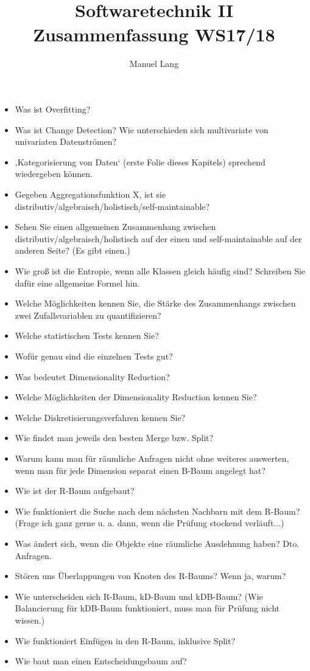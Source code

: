 \documentclass[paper=a4, fontsize=11pt]{scrartcl} %
\title{
\normalfont \normalsize
\horrule{0.5pt} \\[0.4cm] %
\huge Softwaretechnik II\\ Zusammenfassung WS17/18 %
\horrule{2pt} \\[0.5cm] %
}
\author{Manuel Lang} %
\date{} %
\numberwithin{equation}{section} %
\numberwithin{figure}{section} %
\numberwithin{table}{section} %
\begin{document}
\begin{itemize}
\item Was ist Overfitting?
\item Was ist Change Detection? Wie unterschieden sich multivariate von univariaten Datenströmen?
\item ‚Kategorisierung von Daten‘ (erste Folie dieses Kapitels) sprechend wiedergeben können.
\item Gegeben Aggregationsfunktion X, ist sie distributiv/algebraisch/holistisch/self-maintainable?
\item Sehen Sie einen allgemeinen Zusammenhang zwischen distributiv/algebraisch/holistisch auf der einen und self-maintainable auf der anderen Seite? (Es gibt einen.)
\item Wie groß ist die Entropie, wenn alle Klassen gleich häufig sind? Schreiben Sie dafür eine allgemeine Formel hin.
\item Welche Möglichkeiten kennen Sie, die Stärke des Zusammenhangs zwischen zwei Zufallsvariablen zu quantifizieren?
\item  Welche statistischen Tests kennen Sie?
\item Wofür genau sind die einzelnen Tests gut?
\item Was bedeutet Dimensionality Reduction?
\item Welche Möglichkeiten der Dimensionality Reduction kennen Sie?
\item Welche Diskretisierungsverfahren kennen Sie?
\item Wie findet man jeweils den besten Merge bzw. Split?
\item Warum kann man für räumliche Anfragen nicht ohne weiteres auswerten, wenn man für jede Dimension separat einen B-Baum angelegt hat?
\item Wie ist der R-Baum aufgebaut?
\item Wie funktioniert die Suche nach dem nächsten Nachbarn mit dem R-Baum? (Frage ich ganz gerne u. a. dann, wenn die Prüfung stockend verläuft...)
\item Was ändert sich, wenn die Objekte eine räumliche Ausdehnung haben? Dto. Anfragen.
\item Stören uns Überlappungen von Knoten des R-Baums? Wenn ja, warum?
\item Wie unterscheiden sich R-Baum, kD-Baum und kDB-Baum? (Wie Balancierung für kDB-Baum funktioniert, muss man für Prüfung nicht wissen.)
\item Wie funktioniert Einfügen in den R-Baum, inklusive Split?
\item Wie baut man einen Entscheidungsbaum auf?

\end{itemize}
\end{document}
